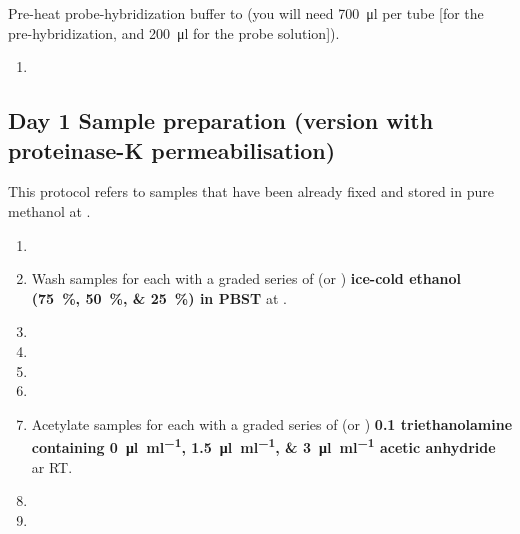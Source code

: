 \documentclass[12pt]{report}
\begin{document}
\bigskip\alert{Pre-heat probe-hybridization buffer to \thirtysevendegree{} (you will need \qty{700}{\ul} per tube [\fivehunmicrol for the pre-hybridization, and \qty{200}{\ul} for the probe solution]).}

\begin{enumerate}[resume = steps]
	\item {}
\end{enumerate}

\subsection*{Day 1 \textendash{} Sample preparation (version with proteinase-K permeabilisation)}

\alert{This protocol refers to samples that have been already fixed and stored in pure methanol at \minustwenty.}

\begin{enumerate}[series = steps]
	\item {}
	\item Wash samples for \underline{\quarter} each with a graded series of \fivehunmicrol{} (or \onemil) \textbf{ice-cold ethanol (\qtylist{75;50;25}{\percent}) in PBST} at \fourdegree.
	\item {}
	\item {}
	\item {}
	\item {}
	\item Acetylate samples for \underline{\quarter} each with a graded series of \fivehunmicrol{} (or \onemil) \textbf{\qty{0.1}{\molar} triethanolamine containing \qtylist{0;1.5;3}{\ul\per\ml} acetic anhydride} ar RT.
	\item {}
	\item {}
\end{enumerate}
\end{document}

